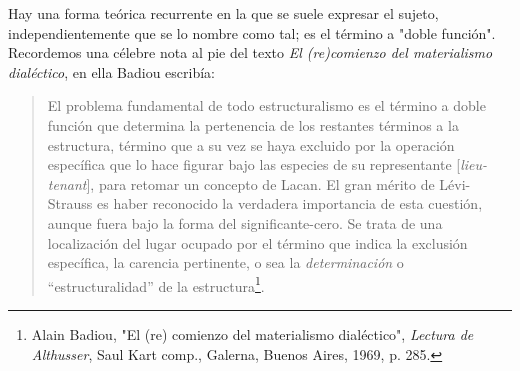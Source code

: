 \documentclass{book}
\begin{document}
Hay una forma teórica recurrente en la que se suele expresar el sujeto,
independientemente que se lo nombre como tal; es el término a "doble
función". Recordemos una célebre nota al pie del texto \emph{El
(re)comienzo del materialismo dialéctico}, en ella Badiou escribía:

\begin{quote}
El problema fundamental de todo estructuralismo es el término a doble
función que determina la pertenencia de los restantes términos a la
estructura, término que a su vez se haya excluido por la operación
específica que lo hace figurar bajo las especies de su representante
{[}\emph{lieu-tenant}{]}, para retomar un concepto de Lacan. El gran
mérito de Lévi-Strauss es haber reconocido la verdadera importancia de
esta cuestión, aunque fuera bajo la forma del significante-cero. Se
trata de una localización del lugar ocupado por el término que indica la
exclusión específica, la carencia pertinente, o sea la
\emph{determinación} o ``estructuralidad'' de la estructura\footnote{Alain
  Badiou, "El (re) comienzo del materialismo dialéctico", \emph{Lectura
  de Althusser}, Saul Kart comp., Galerna, Buenos Aires, 1969, p. 285.}.
\end{quote}
\end{document}
